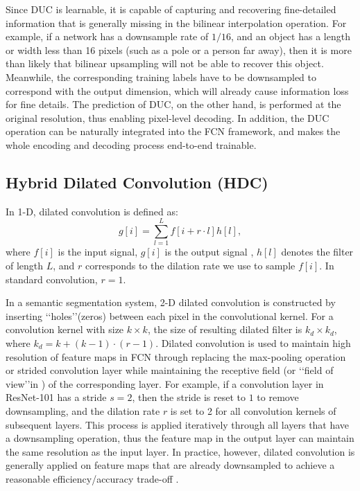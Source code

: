 \documentclass[10pt,twocolumn,letterpaper]{article}
\begin{document}
Since DUC is learnable, it is capable of capturing and recovering fine-detailed information that is generally missing in the bilinear interpolation operation. For example, if a network has a downsample rate of $1/16$, and an object has a length or width less than 16 pixels (such as a pole or a person far away), then it is more than likely that bilinear upsampling will not be able to recover this object. Meanwhile, the corresponding training labels have to be downsampled to correspond with the output dimension, which will already cause information loss for fine details. The prediction of DUC, on the other hand, is performed at the original resolution, thus enabling pixel-level decoding. In addition, the DUC operation can be naturally integrated into the FCN framework, and makes the whole encoding and decoding process end-to-end trainable.

\subsection{Hybrid Dilated Convolution (HDC)}
In 1-D, dilated convolution is defined as:
\begin{equation}
g[i]=\sum_{l=1}^{L}f[i+r\cdot l]h[l],
\end{equation}
where $f[i]$ is the input signal, $g[i]$ is the output signal , $h[l]$ denotes the filter of length $L$, and $r$ corresponds to the dilation rate we use to sample $f[i]$. In standard convolution, $r=1$.

In a semantic segmentation system, 2-D dilated convolution is constructed by inserting \lq\lq holes\rq\rq (zeros) between each pixel in the convolutional kernel. For a convolution kernel with size $k\times{k}$, the size of resulting dilated filter is $k_d\times{k_d}$, where $k_d=k+(k-1)\cdot(r-1)$. Dilated convolution is used to maintain high resolution of feature maps in FCN through replacing the max-pooling operation or strided convolution layer while maintaining the receptive field (or \lq\lq field of view\rq\rq in \cite{chen2016deeplab}) of the corresponding layer. For example, if a convolution layer in ResNet-101 has a stride $s=2$, then the stride is reset to $1$ to remove downsampling, and the dilation rate $r$ is set to 2 for all convolution kernels of subsequent layers. This process is applied iteratively through all layers that have a downsampling operation, thus the feature map in the output layer can maintain the same resolution as the input layer. In practice, however, dilated convolution is generally applied on feature maps that are already downsampled to achieve a reasonable efficiency/accuracy trade-off \cite{chen2016deeplab}.
\end{document}
